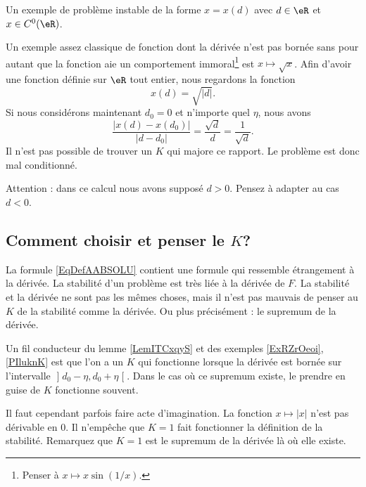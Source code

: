 \begin{example} \label{PIluknK}
    Un exemple de problème instable de la forme  $x=x(d)$ avec $d\in\eR$ et $x \in C^0(\eR)$.

	Un exemple assez classique de fonction dont la dérivée n'est pas bornée sans pour autant que la fonction aie un comportement immoral\footnote{Penser à $x\mapsto x\sin(1/x)$.} est $x\mapsto\sqrt{x}$. Afin d'avoir une fonction définie sur $\eR$ tout entier, nous regardons la fonction
	\begin{equation}
		x(d)=\sqrt{|d|}.
	\end{equation}
	Si nous considérons maintenant $d_0=0$ et n'importe quel $\eta$, nous avons
	\begin{equation}
		\frac{ | x(d)-x(d_0) | }{ | d-d_0 | }=\frac{ \sqrt{d} }{ d }=\frac{1}{ \sqrt{d} }.
	\end{equation}
	Il n'est pas possible de trouver un $K$ qui majore ce rapport. Le problème est donc mal conditionné.

	Attention : dans ce calcul nous avons supposé $d>0$. Pensez à adapter au cas $d<0$.

\end{example}

\subsection{Comment choisir et penser le $K$?}

La formule \eqref{EqDefAABSOLU} contient une formule qui ressemble étrangement à la dérivée. La stabilité d'un problème est très liée à la dérivée de $F$. La stabilité et la dérivée ne sont pas les mêmes choses, mais il n'est pas mauvais de penser au $K$ de la stabilité comme la dérivée. Ou plus précisément : le supremum de la dérivée.

Un fil conducteur du lemme \ref{LemITCxqyS} et des exemples \ref{ExRZrOeoi}, \ref{PIluknK} est que l'on a un $K$ qui fonctionne lorsque la dérivée est bornée sur l'intervalle $\mathopen] d_0-\eta , d_0+\eta \mathclose[$. Dans le cas où ce supremum existe, le prendre en guise de $K$ fonctionne souvent.

Il faut cependant parfois faire acte d'imagination. La fonction $x\mapsto| x |$ n'est pas dérivable en $0$. Il n'empêche que $K=1$ fait fonctionner la définition de la stabilité. Remarquez que $K=1$ est le supremum de la dérivée là où elle existe.

